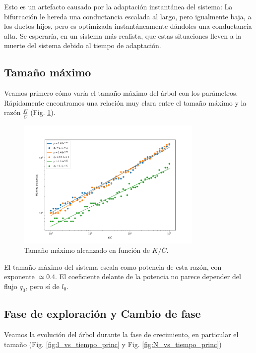 \documentclass{article}
\begin{document}
Esto es un artefacto causado por la adaptación instantánea del sistema: La bifurcación le hereda una conductancia escalada al largo, pero igualmente baja, a los ductos hijos, pero 
es optimizada instantáneamente dándoles una conductancia alta. Se esperaría, en un sistema más realista, que estas situaciones lleven a la muerte del sistema debido al tiempo de adaptación.

\subsection{Tamaño máximo}

Veamos primero cómo varía el tamaño máximo del árbol con los parámetros. Rápidamente encontramos una relación muy clara entre el tamaño máximo y la razón $\frac{K}{\bar{C}}$ (Fig. \ref{fig:max_vs_KC}).

\begin{figure}[h!]
    \centering
    \includegraphics[width=0.8\textwidth]{graficos_inst/max_vs_KC.png}
    \caption{Tamaño máximo alcanzado en función de $K/\bar{C}$.}
    \label{fig:max_vs_KC}
\end{figure}

El tamaño máximo del sistema escala como potencia de esta razón, con exponente $\simeq 0.4$. El coeficiente delante de la potencia no parece depender del flujo $q_0$, pero sí de $l_0$.

\subsection{Fase de exploración y Cambio de fase}

Veamos la evolución del árbol durante la fase de crecimiento, en particular el tamaño (Fig. \ref{fig:l_vs_tiempo_princ} y Fig. \ref{fig:N_vs_tiempo_princ})
\end{document}
